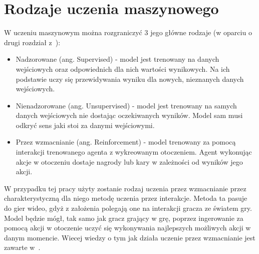 \documentclass{SGGW-thesis}
\begin{document}
\section{Rodzaje uczenia maszynowego}
W uczeniu maszynowym można rozgraniczyć 3 jego główne rodzaje (w oparciu o drugi rozdział z~\cite{MachineLearningTypes}):
\begin{itemize}
  \item{Nadzorowane (ang. Supervised) - model jest trenowany na danych wejściowych oraz odpowiednich dla nich wartości wynikowych. Na ich podstawie uczy się przewidywania wyniku dla nowych, nieznanych danych wejściowych.}
  \item{Nienadzorowane (ang. Unsupervised) - model jest trenowany na samych danych wejściowych nie dostając oczekiwanych wyników. Model sam musi odkryć sens jaki stoi za danymi wejściowymi.}
  \item{Przez wzmacnianie (ang. Reinforcement) - model trenowany za pomocą interakcji trenowanego agenta z wykreowanym otoczeniem. Agent wykonując akcje w otoczeniu dostaje nagrody lub kary w zależności od wyników jego akcji.}
\end{itemize}
W przypadku tej pracy użyty zostanie rodzaj uczenia przez wzmacnianie przez charakterystyczną dla niego metodę uczenia przez interakcje. Metoda ta pasuje do gier wideo, gdyż z założenia polegają one na interakcji gracza ze światem gry.
Model będzie mógł, tak samo jak gracz grający w grę, poprzez ingerowanie za pomocą akcji w otoczenie uczyć się wykonywania najlepszych możliwych akcji w danym momencie. Wiecej wiedzy o tym jak działa uczenie przez wzmacnianie jest zawarte w~\cite{ReinforcementLearning}.
\end{document}
